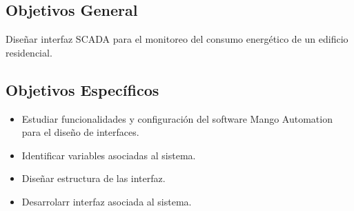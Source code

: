      
\subsection{Objetivos General}
    Diseñar interfaz SCADA para el 
    monitoreo del consumo energético de un 
    edificio residencial.

\subsection{Objetivos Específicos}
\begin{itemize}
    \item Estudiar funcionalidades y configuración
    del software Mango Automation para el diseño de 
    interfaces.
    \item Identificar variables asociadas al sistema.
    \item Diseñar estructura de las interfaz.
    \item Desarrolarr interfaz asociada al sistema.
\end{itemize}
\newpage
